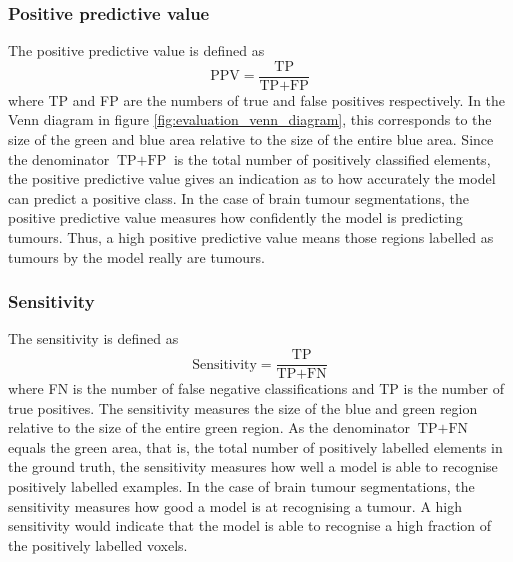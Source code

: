 \documentclass[12pt,a4paper,twoside,openright]{report}
\begin{document}
\subsubsection{Positive predictive value}
The positive predictive value is defined as
\begin{equation}
	\textrm{PPV} = \frac{\textrm{TP}}{\textrm{TP} + \textrm{FP}}
\end{equation}
where \textrm{TP} and \textrm{FP} are the numbers of true and false positives respectively. In the Venn diagram in figure \ref{fig:evaluation_venn_diagram}, this corresponds to the size of the green and blue area relative to the size of the entire blue area.  Since the denominator $\textrm{TP} + \textrm{FP}$ is the total number of positively classified elements, the positive predictive value gives an indication as to how accurately the model can predict a positive class. In the case of brain tumour segmentations, the positive predictive value measures how confidently the model is predicting tumours. Thus, a high positive predictive value means those regions labelled as tumours by the model really are tumours.

\subsubsection{Sensitivity}
The sensitivity is defined as 
\begin{equation}
	\textrm{Sensitivity} = \frac{\textrm{TP}}{\textrm{TP} + \textrm{FN}}
\end{equation}
where \textrm{FN} is the number of false negative classifications and \textrm{TP} is the number of true positives. The sensitivity measures the size of the blue and green region relative to the size of the entire green region. As the denominator $\textrm{TP} + \textrm{FN}$ equals the green area, that is, the total number of positively labelled elements in the ground truth, the sensitivity measures how well a model is able to recognise positively labelled examples. In the case of brain tumour segmentations, the sensitivity measures how good a model is at recognising a tumour. A high sensitivity would indicate that the model is able to recognise a high fraction of the positively labelled voxels.
\end{document}
